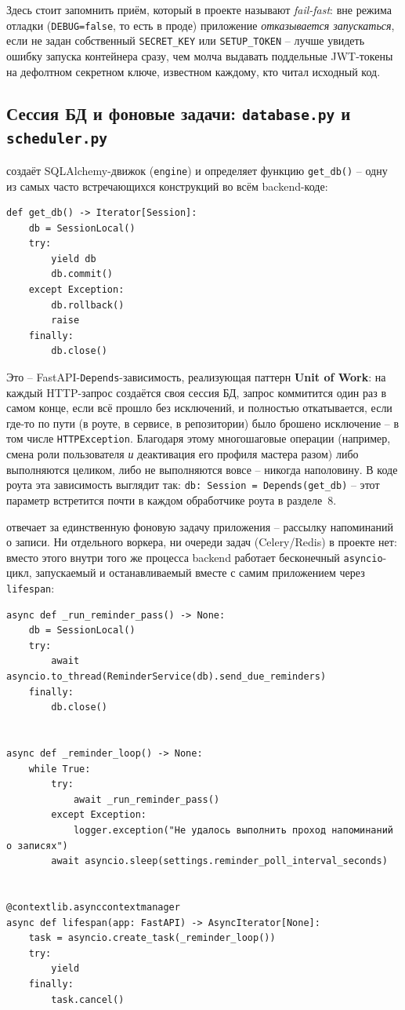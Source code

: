 Здесь стоит запомнить приём, который в проекте называют
\emph{fail-fast}: вне режима отладки (\texttt{DEBUG=false}, то есть в
проде) приложение \emph{отказывается запускаться}, если не задан
собственный \texttt{SECRET_KEY} или \texttt{SETUP_TOKEN} -- лучше
увидеть ошибку запуска контейнера сразу, чем молча выдавать поддельные
JWT-токены на дефолтном секретном ключе, известном каждому, кто читал
исходный код.

\subsection{Сессия БД и фоновые задачи: \texttt{database.py} и \texttt{scheduler.py}}

 создаёт SQLAlchemy-движок
(\texttt{engine}) и определяет функцию \texttt{get_db()} -- одну из
самых часто встречающихся конструкций во всём backend-коде:

\begin{verbatim}
def get_db() -> Iterator[Session]:
    db = SessionLocal()
    try:
        yield db
        db.commit()
    except Exception:
        db.rollback()
        raise
    finally:
        db.close()
\end{verbatim}

Это -- FastAPI-\texttt{Depends}-зависимость, реализующая паттерн
\textbf{Unit of Work}: на каждый HTTP-запрос создаётся своя сессия БД,
запрос коммитится один раз в самом конце, если всё прошло без
исключений, и полностью откатывается, если где-то по пути (в роуте, в
сервисе, в репозитории) было брошено исключение -- в том числе
\texttt{HTTPException}. Благодаря этому многошаговые операции (например,
смена роли пользователя \emph{и} деактивация его профиля мастера разом)
либо выполняются целиком, либо не выполняются вовсе -- никогда наполовину.
В коде роута эта зависимость выглядит так: \texttt{db: Session = Depends(get_db)}
-- этот параметр встретится почти в каждом обработчике роута
в разделе~8.

 отвечает за единственную фоновую
задачу приложения -- рассылку напоминаний о записи. Ни отдельного
воркера, ни очереди задач (Celery/Redis) в проекте нет: вместо этого
внутри того же процесса backend работает бесконечный \texttt{asyncio}-цикл,
запускаемый и останавливаемый вместе с самим приложением через
\texttt{lifespan}:

\begin{verbatim}
async def _run_reminder_pass() -> None:
    db = SessionLocal()
    try:
        await asyncio.to_thread(ReminderService(db).send_due_reminders)
    finally:
        db.close()


async def _reminder_loop() -> None:
    while True:
        try:
            await _run_reminder_pass()
        except Exception:
            logger.exception("Не удалось выполнить проход напоминаний о записях")
        await asyncio.sleep(settings.reminder_poll_interval_seconds)


@contextlib.asynccontextmanager
async def lifespan(app: FastAPI) -> AsyncIterator[None]:
    task = asyncio.create_task(_reminder_loop())
    try:
        yield
    finally:
        task.cancel()
\end{verbatim}


